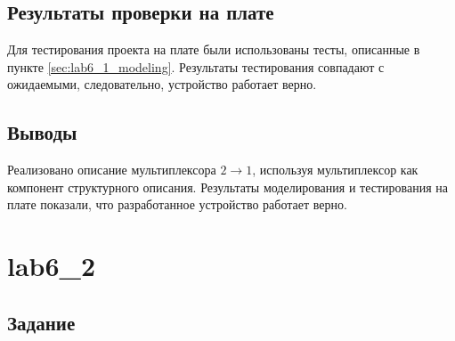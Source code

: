 \subsection{Результаты проверки на плате}

Для тестирования проекта на плате были использованы тесты, описанные в пункте \ref{sec:lab6_1_modeling}. Результаты тестирования совпадают с ожидаемыми, следовательно, устройство работает верно.

\subsection{Выводы}

Реализовано описание мультиплексора  $2 \rightarrow 1$, используя мультиплексор  как компонент структурного описания. Результаты моделирования и тестирования на плате показали, что разработанное устройство работает верно.

\newpage

\section{lab6\_2}

\subsection{Задание}


